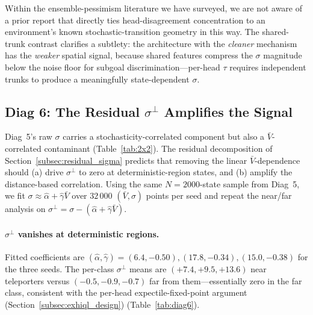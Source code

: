 \documentclass[11pt]{article}
\begin{document}
Within the ensemble-pessimism literature we have surveyed, we are not
aware of a prior report that directly ties head-disagreement
concentration to an environment's known stochastic-transition geometry
in this way.
The shared-trunk contrast clarifies a subtlety: the architecture with the
\emph{cleaner} mechanism has the \emph{weaker} spatial signal, because
shared features compress the $\sigma$ magnitude below the noise floor for
subgoal discrimination---per-head $\tau$ requires independent trunks to
produce a meaningfully state-dependent $\sigma$.

\subsection{Diag 6: The Residual $\sigma^\perp$ Amplifies the Signal}
\label{subsec:diag6}

Diag~5's raw $\sigma$ carries a stochasticity-correlated component but also a
$\bar V$-correlated contaminant (Table~\ref{tab:2x2}).
The residual decomposition of Section~\ref{subsec:residual_sigma} predicts that
removing the linear $\bar V$-dependence should (a) drive $\sigma^\perp$ to
zero at deterministic-region states, and (b) amplify the distance-based
correlation.
Using the same $N = 2000$-state sample from Diag~5, we fit
$\sigma \approx \hat\alpha + \hat\gamma \bar V$ over $32\,000$
$(\bar V, \sigma)$ points per seed and repeat the near/far analysis on
$\sigma^\perp = \sigma - (\hat\alpha + \hat\gamma\bar V)$.

\paragraph{$\sigma^\perp$ vanishes at deterministic regions.}
Fitted coefficients are $(\hat\alpha, \hat\gamma) = (6.4, -0.50), (17.8, -0.34),
(15.0, -0.38)$ for the three seeds.
The per-class $\sigma^\perp$ means are $(+7.4, +9.5, +13.6)$ near teleporters
versus $(-0.5, -0.9, -0.7)$ far from them---essentially zero in the far class,
consistent with the per-head expectile-fixed-point argument
(Section~\ref{subsec:exhiql_design})
(Table~\ref{tab:diag6}).
\end{document}
